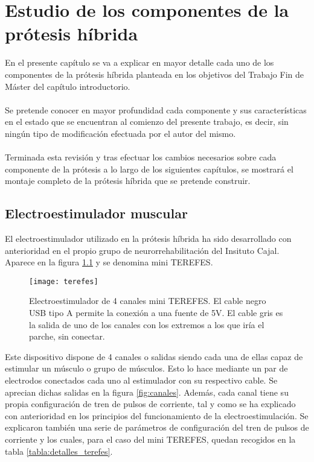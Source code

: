 \chapter{Estudio de los componentes de la prótesis híbrida}\label{capitulo_2}
En el presente capítulo se va a explicar en mayor detalle cada uno de los componentes de la prótesis híbrida planteada en los objetivos del Trabajo Fin de Máster del capítulo introductorio.
\\
\\
Se pretende conocer en mayor profundidad cada componente y sus características en el estado que se encuentran al comienzo del presente trabajo, es decir, sin ningún tipo de modificación efectuada por el autor del mismo.
\\
\\
Terminada esta revisión y tras efectuar los cambios necesarios sobre cada componente de la prótesis a lo largo de los siguientes capítulos, se mostrará el montaje completo de la prótesis híbrida que se pretende construir.

\section{Electroestimulador muscular}
El electroestimulador utilizado en la prótesis híbrida ha sido desarrollado con anterioridad en el propio grupo de neurorrehabilitación del Insituto Cajal. Aparece en la figura \ref{fig:terefes} y se denomina mini TEREFES.\\

\begin{figure}[!htb]
\centering
\texttt{[image: terefes]}
  \caption{Electroestimulador de 4 canales mini TEREFES. El cable negro USB tipo A permite la conexión a una fuente de 5V. El cable gris es la salida de uno de los canales con los extremos a los que iría el parche, sin conectar.}\label{fig:terefes}
\end{figure}

Este dispositivo dispone de 4 canales o salidas siendo cada una de ellas capaz de estimular un músculo o grupo de músculos. Esto lo hace mediante un par de electrodos conectados cada uno al estimulador con su respectivo cable. Se aprecian dichas salidas en la figura \ref{fig:canales}. Además, cada canal tiene su propia configuración de tren de pulsos de corriente, tal y como se ha explicado con anterioridad en los principios del funcionamiento de la electroestimulación. Se explicaron también una serie de parámetros de configuración del tren de pulsos de corriente y los cuales, para el caso del mini TEREFES, quedan recogidos en la tabla \ref{tabla:detalles_terefes}.\\


